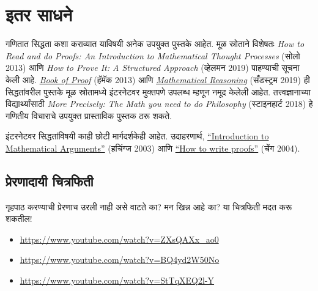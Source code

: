 \section{इतर साधने}\label{mth:prf:res:sec}

गणितात सिद्धता कशा कराव्यात याविषयी अनेक उपयुक्त पुस्तके आहेत. मूळ स्रोताने विशेषतः \emph{How to Read and do Proofs: An Introduction to Mathematical Thought Processes} (सोलो 2013) आणि \emph{How to Prove It: A Structured Approach} (व्हेलमन 2019) पाहण्याची सूचना केली आहे. \href{http://www.people.vcu.edu/~rhammack/BookOfProof/BookOfProof.pdf}{\emph{Book of Proof}} (हॅमॅक 2013) आणि \href{https://scholarworks.gvsu.edu/books/7/}{\emph{Mathematical Reasoning}} (सँडस्ट्रम 2019) ही सिद्धतांवरील पुस्तके मूळ स्रोतामध्ये इंटरनेटवर मुक्तपणे उपलब्ध म्हणून नमूद केलेली आहेत. तत्त्वज्ञानाच्या विद्यार्थ्यांसाठी \emph{More Precisely: The Math you need to do Philosophy} (स्टाइनहार्ट 2018) हे गणितीय विचाराचे उपयुक्त प्रास्ताविक पुस्तक ठरू शकते.

इंटरनेटवर सिद्धतांविषयी काही छोटी मार्गदर्शकेही आहेत. उदाहरणार्थ, \href{https://math.berkeley.edu/~hutching/teach/proofs.pdf}{“Introduction to Mathematical Arguments”} (हचिंग्ज 2003) आणि \href{https://eugeniacheng.com/wp-content/uploads/2017/02/cheng-proofguide.pdf}{“How to write proofs”} (चेंग 2004).

\subsection{प्रेरणादायी चित्रफिती}

गृहपाठ करण्याची प्रेरणाच उरली नाही असे वाटते का? मन खिन्न आहे का? या चित्रफिती मदत करू शकतील!

\begin{itemize}
\item \url{https://www.youtube.com/watch?v=ZXsQAXx_ao0}
\item \url{https://www.youtube.com/watch?v=BQ4yd2W50No}
\item \url{https://www.youtube.com/watch?v=StTqXEQ2l-Y}
\end{itemize}



